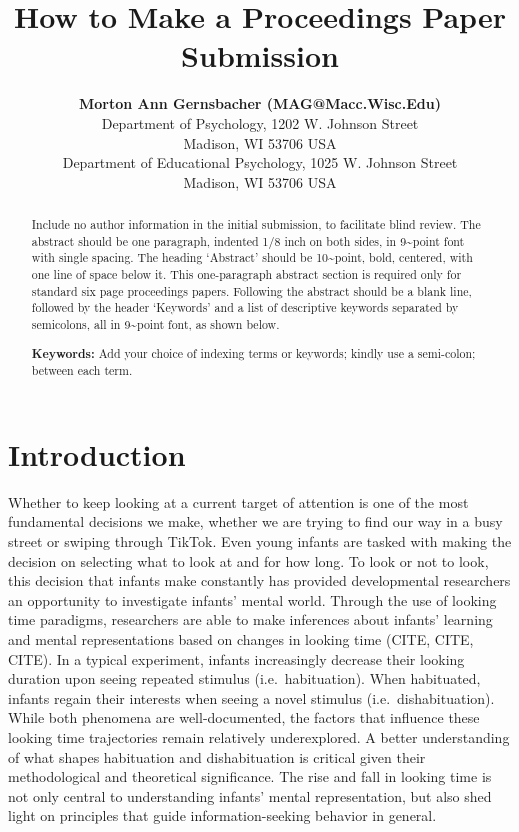 \documentclass[10pt, letterpaper]{article}
\title{How to Make a Proceedings Paper Submission}
\author{{\large \bf Morton Ann Gernsbacher (MAG@Macc.Wisc.Edu)} \\ Department of Psychology, 1202 W. Johnson Street \\ Madison, WI 53706 USA \AND {\large \bf Sharon J.~Derry (SDJ@Macc.Wisc.Edu)} \\ Department of Educational Psychology, 1025 W. Johnson Street \\ Madison, WI 53706 USA}
\begin{document}
\maketitle

\begin{abstract}
Include no author information in the initial submission, to facilitate blind review. The abstract should be one paragraph, indented 1/8 inch on both sides, in 9\textasciitilde point font with single spacing. The heading `Abstract' should be 10\textasciitilde point, bold, centered, with one line of space below it. This one-paragraph abstract section is required only for standard six page proceedings papers. Following the abstract should be a blank line, followed by the header `Keywords' and a list of descriptive keywords separated by semicolons, all in 9\textasciitilde point font, as shown below.

\textbf{Keywords:}
Add your choice of indexing terms or keywords; kindly use a semi-colon; between each term.
\end{abstract}

\hypertarget{introduction}{%
\section{Introduction}\label{introduction}}

Whether to keep looking at a current target of attention is one of the most fundamental decisions we make, whether we are trying to find our way in a busy street or swiping through TikTok. Even young infants are tasked with making the decision on selecting what to look at and for how long. To look or not to look, this decision that infants make constantly has provided developmental researchers an opportunity to investigate infants' mental world. Through the use of looking time paradigms, researchers are able to make inferences about infants' learning and mental representations based on changes in looking time (CITE, CITE, CITE). In a typical experiment, infants increasingly decrease their looking duration upon seeing repeated stimulus (i.e.~habituation). When habituated, infants regain their interests when seeing a novel stimulus (i.e.~dishabituation). While both phenomena are well-documented, the factors that influence these looking time trajectories remain relatively underexplored. A better understanding of what shapes habituation and dishabituation is critical given their methodological and theoretical significance. The rise and fall in looking time is not only central to understanding infants' mental representation, but also shed light on principles that guide information-seeking behavior in general.
\end{document}
